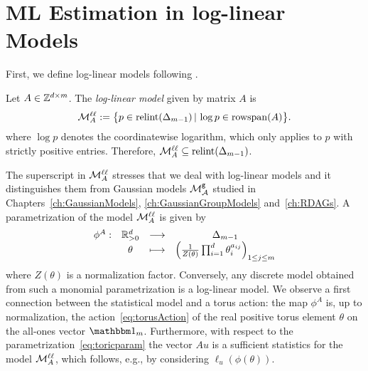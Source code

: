 



\section{ML Estimation in log-linear Models} \label{sec:LogLinearIntro}


First, we define log-linear models following \cite[Definition~6.2.1]{SullivantBook}.

\begin{defn}\label{defn:LogLinearModel}
	Let $A \in \mathbb Z^{d \times m}$.
	The \emph{log-linear model} given by matrix  $A$ is
	\begin{equation}
		\label{eq:logLinearModel}
		\mathcal{M}^{\mathtt{\ell \ell}}_A := \big\{ p \in \operatorname{relint}(\Delta_{m-1}) \, \vert \, \log p \in \operatorname{rowspan}(A) \big\}.
	\end{equation}
	where $\log p$ denotes the coordinatewise logarithm, which only applies to $p$ with strictly positive entries. Therefore, $\mathcal{M}^{\mathtt{\ell \ell}}_A \subseteq \operatorname{relint}(\Delta_{m-1})$.
	\hfill{}
\end{defn}

The superscript in $\mathcal{M}^{\mathtt{\ell \ell}}_A$ stresses that we deal with log-linear models and it distinguishes them from Gaussian models $\mathcal{M}^{\mathtt{g}}_{\mathcal{A}}$ studied in Chapters~\ref{ch:GaussianModels}, \ref{ch:GaussianGroupModels} and~\ref{ch:RDAGs}.
A parametrization of the model $\mathcal{M}^{\mathtt{\ell \ell}}_A$ is given by
\begin{equation}
	\label{eq:toricparam}
	\begin{matrix} \phi^A: & \mathbb R_{>0}^d & \longrightarrow & \Delta_{m-1} \\
		& \theta & \longmapsto &  \left( \frac{1}{Z(\theta)} \prod_{i=1}^d \theta_i^{a_{ij}} \right)_{1 \leq j \leq m} \end{matrix}
\end{equation}
where $Z(\theta)$ is a normalization factor. Conversely, any discrete model obtained from such a monomial parametrization is a log-linear model.
We observe a first connection between the statistical model and a torus action: the map $\phi^A$ is, up to normalization, the action~\eqref{eq:torusAction} of the real positive torus element $\theta$ on the all-ones vector $\ones_m$.
Furthermore, with respect to the parametrization~\eqref{eq:toricparam} the vector $Au$ is a sufficient statistics for the model $\mathcal{M}^{\mathtt{\ell \ell}}_A$, which follows, e.g., by considering $\ell_{u}(\phi(\theta))$.

